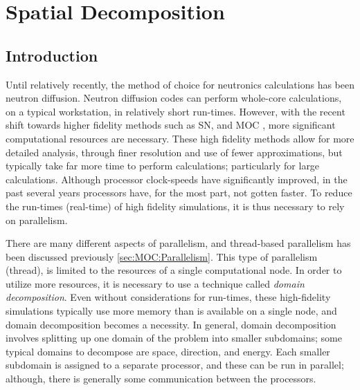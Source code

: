 \chapter{Spatial Decomposition}{\label{ch:Spatial Decomposition}
  \def\figpath{chapters/05/figures/}
  \graphicspath{ {\figpath} }
  \section{Introduction}{\label{sec:Spatial Decomposition:Introduction}
    Until relatively recently, the method of choice for neutronics calculations has been neutron diffusion.
    Neutron diffusion codes can perform whole-core calculations, on a typical workstation, in relatively short run-times.
    However, with the recent shift towards higher fidelity methods such as \ac{SN}, and \ac{MOC} \cite{Askew1972}, more significant computational resources are necessary.
    These high fidelity methods allow for more detailed analysis, through finer resolution and use of fewer approximations, but typically take far more time to perform calculations; particularly for large calculations.
    Although processor clock-speeds have significantly improved, in the past several years processors have, for the most part, not gotten faster.
    To reduce the run-times (real-time) of high fidelity simulations, it is thus necessary to rely on parallelism.

    There are many different aspects of parallelism, and thread-based parallelism has been discussed previously \cref{sec:MOC:Parallelism}.
    This type of parallelism (thread), is limited to the resources of a single computational node.
    In order to utilize more resources, it is necessary to use a technique called \emph{domain decomposition}.
    Even without considerations for run-times, these high-fidelity simulations typically use more memory than is available on a single node, and domain decomposition becomes a necessity.
    In general, domain decomposition involves splitting up one domain of the problem into smaller subdomains; some typical domains to decompose are space, direction, and energy.
    Each smaller subdomain is assigned to a separate processor, and these can be run in parallel; although, there is generally some communication between the processors.

}}

